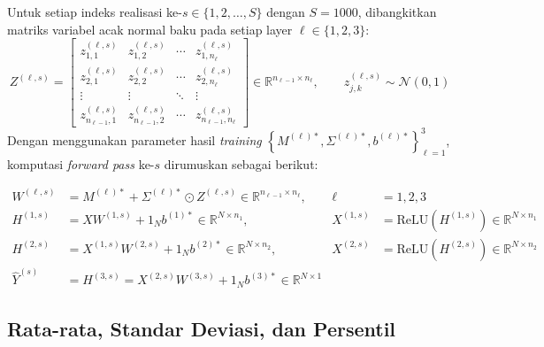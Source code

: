 \documentclass[11pt,a4paper]{article}
\def\mathbf#1{#1}%
\theoremstyle{plain}
\theoremstyle{definition}
\theoremstyle{remark}
\begin{document}
\noindent Untuk setiap indeks realisasi ke-$s \in \{1, 2, \dots, S\}$ dengan $S = 1000$, dibangkitkan matriks variabel acak normal baku pada setiap layer $\ell \in \{1, 2, 3\}$:
\begin{equation}
    Z^{(\ell, s)} = \begin{bmatrix}
        z_{1, 1}^{(\ell, s)} & z_{1, 2}^{(\ell, s)} & \cdots & z_{1, n_\ell}^{(\ell, s)} \\
        z_{2, 1}^{(\ell, s)} & z_{2, 2}^{(\ell, s)} & \cdots & z_{2, n_\ell}^{(\ell, s)} \\
        \vdots & \vdots & \ddots & \vdots \\
        z_{n_{\ell-1}, 1}^{(\ell, s)} & z_{n_{\ell-1}, 2}^{(\ell, s)} & \cdots & z_{n_{\ell-1}, n_\ell}^{(\ell, s)}
    \end{bmatrix} \in \mathbb{R}^{n_{\ell-1} \times n_\ell}, \qquad z_{j, k}^{(\ell, s)} \sim \mathcal{N}(0, 1) \label{eq:z_sampling}
\end{equation}
Dengan menggunakan parameter hasil \textit{training} $\left\{ M^{(\ell)*}, \Sigma^{(\ell)*}, \mathbf{b}^{(\ell)*} \right\}_{\ell=1}^{3}$, komputasi \textit{forward pass} ke-$s$ dirumuskan sebagai berikut:
\begin{mathbox}
\begin{align}
    W^{(\ell, s)} &= M^{(\ell)*} + \Sigma^{(\ell)*} \odot Z^{(\ell, s)} \in \mathbb{R}^{n_{\ell-1} \times n_\ell}, & \ell &= 1, 2, 3 \label{eq:mc_w_2d} \\[0.2em]
    H^{(1, s)} &= X W^{(1, s)} + \mathbf{1}_N \mathbf{b}^{(1)*} \in \mathbb{R}^{N \times n_1}, & X^{(1, s)} &= \text{ReLU}\!\left(H^{(1, s)}\right) \in \mathbb{R}^{N \times n_1} \label{eq:mc_l1_2d} \\[0.2em]
    H^{(2, s)} &= X^{(1, s)} W^{(2, s)} + \mathbf{1}_N \mathbf{b}^{(2)*} \in \mathbb{R}^{N \times n_2}, & X^{(2, s)} &= \text{ReLU}\!\left(H^{(2, s)}\right) \in \mathbb{R}^{N \times n_2} \label{eq:mc_l2_2d} \\[0.2em]
    \hat{Y}^{(s)} &= H^{(3, s)} = X^{(2, s)} W^{(3, s)} + \mathbf{1}_N \mathbf{b}^{(3)*} \in \mathbb{R}^{N \times 1} \label{eq:mc_l3_2d}
\end{align}
\end{mathbox}

\subsection{Rata-rata, Standar Deviasi, dan Persentil}
\label{subsec:statistik_persentil}
\end{document}
